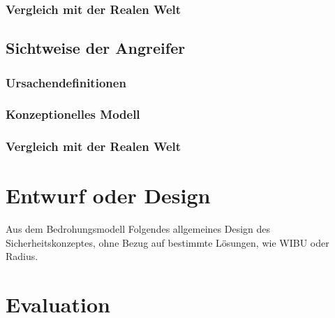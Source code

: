 \documentclass[11pt,a4paper]{report}
\begin{document}
\subsection{Vergleich mit der Realen Welt}

\section{Sichtweise der Angreifer}

\subsection{Ursachendefinitionen}

\subsection{Konzeptionelles Modell}

\subsection{Vergleich mit der Realen Welt}


\chapter{Entwurf oder Design} \label{chap:design}

Aus dem Bedrohungsmodell Folgendes allgemeines Design des Sicherheitskonzeptes, ohne Bezug auf bestimmte Lösungen, wie WIBU oder Radius.

\chapter{Evaluation} \label{chap:evaluation}
\end{document}
